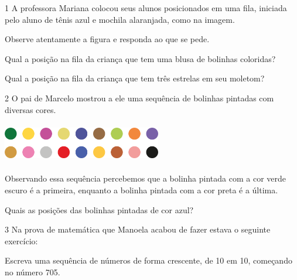 
\num{1} A professora Mariana colocou seus alunos posicionados em uma fila, iniciada pelo aluno de tênis azul e mochila alaranjada, como na imagem.


Observe atentamente a figura e responda ao que se pede.

\begin{escolha}
\item Qual a posição na fila da criança que tem uma blusa de bolinhas coloridas?


\item Qual a posição na fila da criança que tem três estrelas em seu moletom?

\end{escolha}

\num{2} O pai de Marcelo mostrou a ele uma sequência de bolinhas pintadas com
diversas cores.


\includegraphics[width=2.72524in,height=0.68339in]{media/image28.png}

Observando essa sequência percebemos que a bolinha pintada com a cor
verde escuro é a primeira, enquanto a bolinha pintada com a cor preta é a
última.

Quais as posições das bolinhas pintadas de cor azul?


\num{3} Na prova de matemática que Manoela acabou de fazer estava o seguinte exercício:

Escreva uma sequência de números de forma crescente, de 10 em 10, começando no número 705.

